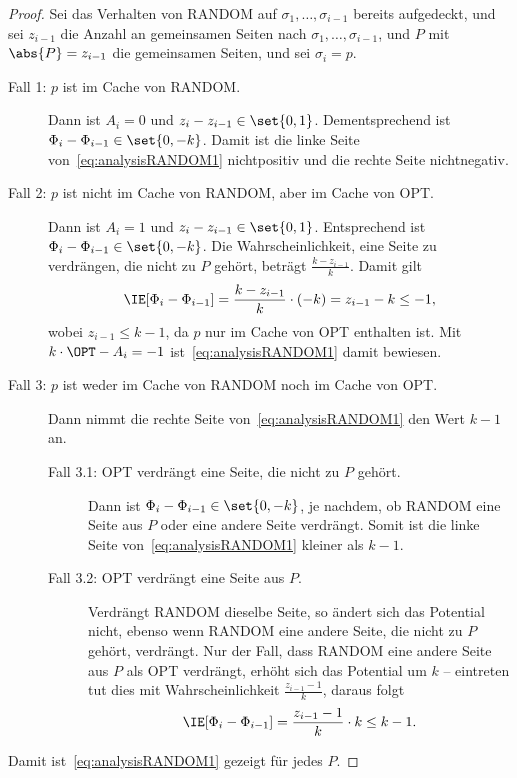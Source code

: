 \documentclass[language=ngerman,algolist]{TemplateLecture}
\begin{document}
\begin{proof}
    Sei das Verhalten von RANDOM auf $\sigma_1, \ldots, \sigma_{i-1}$ bereits aufgedeckt, und sei $z_{i-1}$ die Anzahl an gemeinsamen Seiten nach $\sigma_1, \ldots, \sigma_{i-1}$, und $P$ mit $\abs{P} = z_{i-1}$ die gemeinsamen Seiten, und sei $\sigma_i = p$.
    \begin{description}
        \item[Fall 1: $p$ ist im Cache von RANDOM.] Dann ist $A_i = 0$ und $z_i - z_{i-1} \in \set{0,1}$. Dementsprechend ist $\Phi_i - \Phi_{i-1} \in \set{0,-k}$. Damit ist die linke Seite von~\eqref{eq:analysisRANDOM1} nichtpositiv und die rechte Seite nichtnegativ.
        \item[Fall 2: $p$ ist nicht im Cache von RANDOM, aber im Cache von OPT.] Dann ist $A_i = 1$ und $z_i - z_{i-1} \in \set{0,1}$. Entsprechend ist $\Phi_i - \Phi_{i-1} \in \set{0, -k}$. Die Wahrscheinlichkeit, eine  Seite zu verdrängen, die nicht zu $P$ gehört, beträgt $\frac{k - z_{i-1}}{k}$. Damit gilt 
        \begin{equation}
            \IE[\Phi_i - \Phi_{i-1}] = \frac{k - z_{i-1}}{k} \cdot (-k) = z_{i-1} - k \leq -1,\label{eq:analysisRANDOM2}
        \end{equation}
        wobei $z_{i-1} \leq k-1$, da $p$ nur im Cache von OPT enthalten ist. Mit $k \cdot \OPT - A_i = -1$ ist~\eqref{eq:analysisRANDOM1} damit bewiesen.
        \item[Fall 3: $p$ ist weder im Cache von RANDOM noch im Cache von OPT.] Dann nimmt die rechte Seite von~\eqref{eq:analysisRANDOM1} den Wert $k-1$ an.
        \begin{description}
            \item[Fall 3.1: OPT verdrängt eine Seite, die nicht zu $P$ gehört.] Dann ist $\Phi_i - \Phi_{i-1} \in \set{0, -k}$, je nachdem, ob RANDOM eine Seite aus $P$ oder eine andere Seite verdrängt. Somit ist die linke Seite von~\eqref{eq:analysisRANDOM1} kleiner als $k-1$.
            \item[Fall 3.2: OPT verdrängt eine Seite aus $P$.] Verdrängt RANDOM dieselbe Seite, so ändert sich das Potential nicht, ebenso wenn RANDOM eine andere Seite, die nicht zu $P$ gehört, verdrängt. Nur der Fall, dass RANDOM eine andere Seite aus $P$ als OPT verdrängt, erhöht sich das Potential um $k$ -- eintreten tut dies mit Wahrscheinlichkeit $\frac{z_{i-1} - 1}{k}$, daraus folgt 
            \begin{equation}
                \IE[\Phi_i - \Phi_{i-1}] = \frac{z_{i-1} - 1}{k} \cdot k \leq k - 1. \label{eq:analysisRANDOM3}
            \end{equation}
        \end{description} 
    \end{description}
    Damit ist~\eqref{eq:analysisRANDOM1} gezeigt für jedes $P$.
\end{proof}
\end{document}
